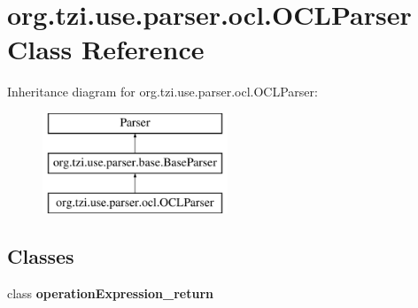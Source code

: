 \hypertarget{classorg_1_1tzi_1_1use_1_1parser_1_1ocl_1_1_o_c_l_parser}{\section{org.\-tzi.\-use.\-parser.\-ocl.\-O\-C\-L\-Parser Class Reference}
\label{classorg_1_1tzi_1_1use_1_1parser_1_1ocl_1_1_o_c_l_parser}
}
Inheritance diagram for org.\-tzi.\-use.\-parser.\-ocl.\-O\-C\-L\-Parser\-:\begin{figure}[H]
\begin{center}
\leavevmode
\includegraphics[height=3.000000cm]{classorg_1_1tzi_1_1use_1_1parser_1_1ocl_1_1_o_c_l_parser}
\end{center}
\end{figure}
\subsection*{Classes}
\begin{DoxyCompactItemize}
\item 
class {\bfseries operation\-Expression\-\_\-return}
\end{DoxyCompactItemize}
